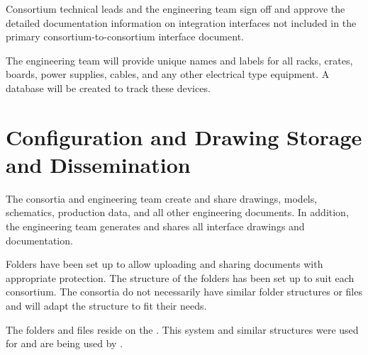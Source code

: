 Consortium technical leads and the  engineering team sign off
and approve the detailed documentation information on integration
interfaces not included in the primary consortium-to-consortium
interface document.

The  engineering team will provide unique names and labels
for all racks, crates, boards, power supplies, cables, and any other
electrical type equipment.  A database will be created to track these
devices.

\section{Configuration and Drawing Storage and Dissemination}
\label{sec:fdsp-coord-integ-modelplan}

The consortia and  engineering team create and share
drawings, models, schematics, production data, and all other
engineering documents. In addition, the  engineering team
generates and shares all interface drawings and documentation.

Folders have been set up to allow uploading and sharing documents
with appropriate protection. The structure of the folders has been set
up to suit each consortium. The consortia do not necessarily have
similar folder structures or files  and will adapt the structure to fit
their needs.

The folders and files reside on the . This system and
similar structures were used for  and are being
used by .

